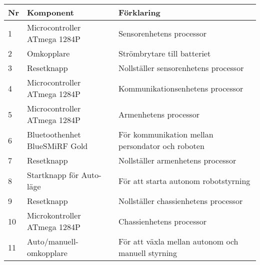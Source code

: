 \begin{center}
    \begin{tabular}{| l | l | l |}
    \hline
   \textbf{Nr} &  \textbf{Komponent} &  \textbf{Förklaring} \\ \hline
    1 & Microcontroller ATmega 1284P & Sensorenhetens processor \\ \hline
 2 & Omkopplare & Strömbrytare till batteriet \\ \hline
 3 & Resetknapp & Nollställer sensorenhetens processor \\ \hline
 4 & Microcontroller ATmega 1284P & Kommunikationsenhetens processor \\ \hline
 5 & Microcontroller ATmega 1284P & Armenhetens processor \\ \hline
 6 & Bluetoothenhet BlueSMiRF Gold &  För kommunikation mellan persondator och roboten\\ \hline
 7 & Resetknapp & Nollställer armenhetens processor \\ \hline
 8 & Startknapp för Auto-läge & För att starta autonom robotstyrning \\ \hline
9 & Resetknapp & Nollställer chassienhetens processor \\ \hline
10 & Microkontroller ATmega 1284P & Chassienhetens processor \\ \hline
11 & Auto/manuell-omkopplare & För att växla mellan autonom och manuell styrning \\ \hline
    \end{tabular}
\end{center}
